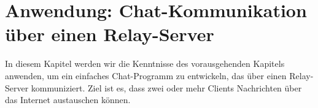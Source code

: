 \newcommand{\ipPlaceHolder}{
    \foreach \i in {1,...,3}{\TextField[name=ip\i, width=1.5cm,print,borderwidth=0, backgroundcolor={0.9 0.9 0.9}]{}.}\TextField[name=ip4, width=1.5cm,print,borderwidth=0, backgroundcolor={0.9 0.9 0.9}]{}
}
\chapter{Anwendung: Chat-Kommunikation über einen Relay-Server}

In diesem Kapitel werden wir die Kenntnisse des vorausgehenden Kapitels anwenden, um ein einfaches Chat-Programm zu entwickeln, das über einen Relay-Server kommuniziert. Ziel ist es, dass zwei oder mehr Clients Nachrichten über das Internet austauschen können.






